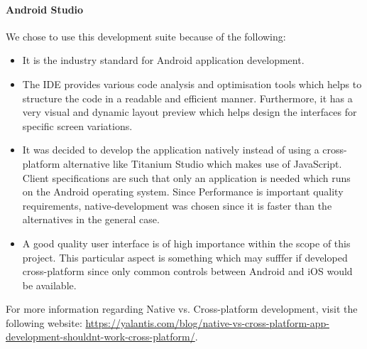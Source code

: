 \documentclass[11pt,a4paper,titlepage]{article}
\begin{document}
			\paragraph{Android Studio}
				 We chose to use this development suite because of the following:
				\begin{itemize}
				\item It is the industry standard for Android application development.
				\item The IDE provides various code analysis and optimisation tools which helps to structure the code in a readable and efficient manner. Furthermore, it has a very visual and dynamic layout preview which helps design the interfaces for specific screen variations.
				\item It was decided to develop the application natively instead of using a cross-platform alternative like Titanium Studio which makes use of JavaScript.  Client specifications are such that only an application is needed which runs on the Android operating system. Since Performance is important quality requirements, native-development was chosen since it is faster than the alternatives in the general case. 
				\item A good quality user interface is of high importance within the scope of this project. This particular aspect is something which may sufffer if developed cross-platform since only common controls between Android and iOS would be available.
\end{itemize} 
				For more information regarding Native vs. Cross-platform development, visit the following website:  \url{https://yalantis.com/blog/native-vs-cross-platform-app-development-shouldnt-work-cross-platform/}.
\end{document}
